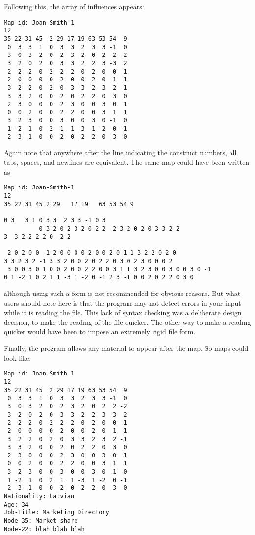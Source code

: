 \documentclass[%
	11pt,
        a4paper,
        twoside]{workrep}
\begin{document}
Following this, the array of influences appears:

\begin{verbatim}
Map id: Joan-Smith-1
12
35 22 31 45  2 29 17 19 63 53 54  9
 0  3  3  1  0  3  3  2  3  3 -1  0
 3  0  3  2  0  2  3  2  0  2  2 -2
 3  2  0  2  0  3  3  2  2  3 -3  2
 2  2  2  0 -2  2  2  0  2  0  0 -1
 2  0  0  0  0  2  0  0  2  0  1  1
 3  2  2  0  2  0  3  3  2  3  2 -1
 3  3  2  0  0  2  0  2  2  0  3  0
 2  3  0  0  0  2  3  0  0  3  0  1
 0  0  2  0  0  2  2  0  0  3  1  1
 3  2  3  0  0  3  0  0  3  0 -1  0
 1 -2  1  0  2  1  1 -3  1 -2  0 -1
 2  3 -1  0  0  2  0  2  2  0  3  0
\end{verbatim}

Again note that anywhere after the line indicating the construct
numbers, all tabs, spaces, and newlines are equivalent.  The same map
could have been written as
\begin{verbatim}
Map id: Joan-Smith-1
12
35 22 31 45 2 29   17 19   63 53 54 9

0 3   3 1 0 3 3  2 3 3 -1 0 3
          0 3 2 0 2 3 2 0 2 2 -2 3 2 0 2 0 3 3 2 2
3 -3 2 2 2 2 0 -2 2

 2 0 2 0 0 -1 2 0 0 0 0 2 0 0 2 0 1 1 3 2 2 0 2 0
3 3 2 3 2 -1 3 3 2 0 0 2 0 2 2 0 3 0 2 3 0 0 0 2 
 3 0 0 3 0 1 0 0 2 0 0 2 2 0 0 3 1 1 3 2 3 0 0 3 0 0 3 0 -1
0 1 -2 1 0 2 1 1 -3 1 -2 0 -1 2 3 -1 0 0 2 0 2 2 0 3 0
\end{verbatim}
although using such a form is not recommended for obvious reasons.
But what users should note here is that the program may not detect
errors in your input while it is reading the file.  This lack of
syntax checking was a deliberate design decision, to make the
reading of the file quicker.  The other way to make a reading
quicker would have been to impose an extremely rigid file form.

Finally, the program allows any material to appear after the map.  So
maps could look like:

\begin{verbatim}
Map id: Joan-Smith-1
12
35 22 31 45  2 29 17 19 63 53 54  9
 0  3  3  1  0  3  3  2  3  3 -1  0
 3  0  3  2  0  2  3  2  0  2  2 -2
 3  2  0  2  0  3  3  2  2  3 -3  2
 2  2  2  0 -2  2  2  0  2  0  0 -1
 2  0  0  0  0  2  0  0  2  0  1  1
 3  2  2  0  2  0  3  3  2  3  2 -1
 3  3  2  0  0  2  0  2  2  0  3  0
 2  3  0  0  0  2  3  0  0  3  0  1
 0  0  2  0  0  2  2  0  0  3  1  1
 3  2  3  0  0  3  0  0  3  0 -1  0
 1 -2  1  0  2  1  1 -3  1 -2  0 -1
 2  3 -1  0  0  2  0  2  2  0  3  0
Nationality: Latvian
Age: 34
Job-Title: Marketing Directory
Node-35: Market share
Node-22: blah blah blah
\end{verbatim}
\end{document}
